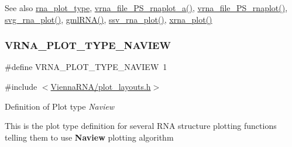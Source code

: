 \begin{DoxySeeAlso}{See also}
\hyperlink{group__plotting__utils_ga5964c4581431b098b80027d6e14dcdd4}{rna\+\_\+plot\+\_\+type}, \hyperlink{plot__structure_8h_a139a31dd0ba9fc6612431f67de901c31}{vrna\+\_\+file\+\_\+\+P\+S\+\_\+rnaplot\+\_\+a()}, \hyperlink{plot__structure_8h_abdc8f6548ba4a3bc3cd868ccbcfdb86a}{vrna\+\_\+file\+\_\+\+P\+S\+\_\+rnaplot()}, \hyperlink{plot__structure_8h_ae7853539b5df98f294b4af434e979304}{svg\+\_\+rna\+\_\+plot()}, \hyperlink{plot__structure_8h_a70834bc8c0aad4fe6824ff76ccb8f329}{gml\+R\+N\+A()}, \hyperlink{plot__structure_8h_add368528755f9a830727b680243541df}{ssv\+\_\+rna\+\_\+plot()}, \hyperlink{plot__structure_8h_a2f6d5953e6a323df898896b8d6614483}{xrna\+\_\+plot()} 
\end{DoxySeeAlso}
\mbox{\label{group__plotting__utils_ga94d4c863ecac2f220f76658afb92f964}} 
\subsubsection{\texorpdfstring{V\+R\+N\+A\+\_\+\+P\+L\+O\+T\+\_\+\+T\+Y\+P\+E\+\_\+\+N\+A\+V\+I\+EW}{VRNA\_PLOT\_TYPE\_NAVIEW}}
{\footnotesize\ttfamily \#define V\+R\+N\+A\+\_\+\+P\+L\+O\+T\+\_\+\+T\+Y\+P\+E\+\_\+\+N\+A\+V\+I\+EW~1}



{\ttfamily \#include $<$\hyperlink{plot__layouts_8h}{Vienna\+R\+N\+A/plot\+\_\+layouts.\+h}$>$}



Definition of Plot type {\itshape Naview} 

This is the plot type definition for several R\+NA structure plotting functions telling them to use {\bfseries Naview} plotting algorithm

